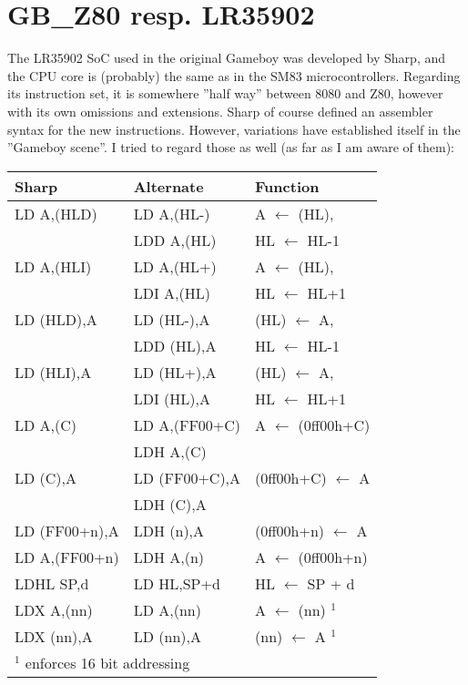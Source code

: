 \documentclass[12pt,twoside]{report}
\begin{document}

\section{GB\_Z80 resp. LR35902}

The LR35902 SoC used in the original Gameboy  was developed by Sharp,
and the CPU core is (probably) the same as in the SM83
microcontrollers.  Regarding its instruction set, it is somewhere
''half way'' between 8080 and Z80, however with its own omissions and
extensions.  Sharp of course defined an assembler syntax for the new
instructions.  However, variations have established itself in the
''Gameboy scene''.  I tried to regard those as well (as far as I am
aware of them):

\begin{center}\begin{tabular}{|l|l|l|}
\hline
Sharp & Alternate & Function \\
\hline
\hline
LD A,(HLD)    & LD A,(HL-)  & A $\longleftarrow$ (HL), \\
              & LDD A,(HL)  & HL $\longleftarrow$ HL-1 \\
\hline
LD A,(HLI)    & LD A,(HL+)  & A $\longleftarrow$ (HL), \\
              & LDI A,(HL)  & HL $\longleftarrow$ HL+1 \\
\hline
LD (HLD),A    & LD (HL-),A  & (HL) $\longleftarrow$ A, \\
              & LDD (HL),A  & HL $\longleftarrow$ HL-1 \\
\hline
LD (HLI),A    & LD (HL+),A  & (HL) $\longleftarrow$ A, \\
              & LDI (HL),A  & HL $\longleftarrow$ HL+1 \\
\hline
LD A,(C)      & LD A,(FF00+C) & A $\longleftarrow$ (0ff00h+C) \\
              & LDH A,(C)     & \\
\hline
LD (C),A      & LD (FF00+C),A & (0ff00h+C) $\longleftarrow$ A \\
              & LDH (C),A     & \\
\hline
LD (FF00+n),A & LDH (n),A     & (0ff00h+n) $\longleftarrow$ A \\
\hline
LD A,(FF00+n) & LDH A,(n)     & A $\longleftarrow$ (0ff00h+n) \\
\hline
LDHL SP,d     & LD HL,SP+d    & HL $\longleftarrow$ SP + d \\
\hline
LDX A,(nn)    & LD A,(nn)     & A $\longleftarrow$ (nn) $^{1}$ \\
\hline
LDX (nn),A    & LD (nn),A     & (nn) $\longleftarrow$ A $^{1}$ \\
\hline
\multicolumn{3}{|l|}{$^{1}$ enforces 16 bit addressing } \\
\hline
\end{tabular}\end{center}
 
\end{document}
